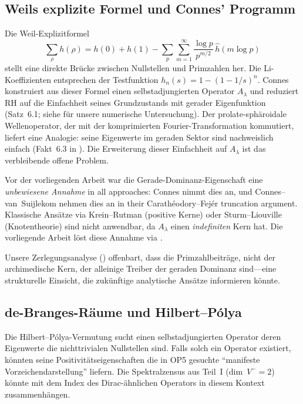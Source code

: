 \documentclass[12pt,a4paper]{article}
\theoremstyle{definition}
\theoremstyle{remark}
\begin{document}
\subsection{Weils explizite Formel und Connes' Programm}
Die Weil-Explizitformel
\[ \sum_\rho h(\rho) = h(0) + h(1) - \sum_p \sum_{m=1}^\infty \frac{\log p}{p^{m/2}}\,\hat{h}(m\log p) \]
stellt eine direkte Brücke zwischen Nullstellen und Primzahlen her. Die Li-Koeffizienten entsprechen der Testfunktion $h_n(s) = 1-(1-1/s)^n$. Connes \cite{Connes2026} konstruiert aus dieser Formel einen selbstadjungierten Operator $A_\lambda$ und reduziert RH auf die Einfachheit seines Grundzustands mit gerader Eigenfunktion (Satz~6.1; siehe  für unsere numerische Untersuchung). Der prolate-sphäroidale Wellenoperator, der mit der komprimierten Fourier-Transformation kommutiert, liefert eine Analogie: seine Eigenwerte im geraden Sektor sind nachweislich einfach (Fakt~6.3 in \cite{Connes2026}). Die Erweiterung dieser Einfachheit auf $A_\lambda$ ist das verbleibende offene Problem.

Vor der vorliegenden Arbeit war die Gerade-Dominanz-Eigenschaft eine \emph{unbewiesene Annahme} in all approaches: Connes \cite{Connes2026} nimmt dies an, und Connes--van~Suijlekom \cite{ConnesvS2025} nehmen dies an in their Carath\'eodory--Fej\'er truncation argument. Klassische Ansätze via Krein--Rutman (positive Kerne) oder Sturm--Liouville (Knotentheorie) sind nicht anwendbar, da $A_\lambda$ einen \emph{indefiniten} Kern hat. Die vorliegende Arbeit löst diese Annahme via .

Unsere Zerlegungsanalyse () offenbart, dass die Primzahlbeiträge, nicht der archimedische Kern, der alleinige Treiber der geraden Dominanz sind---eine strukturelle Einsicht, die zukünftige analytische Ansätze informieren könnte.

\subsection{de-Branges-R\"aume und Hilbert--P\'olya}
Die Hilbert--Pólya-Vermutung sucht einen selbstadjungierten Operator deren Eigenwerte die nichttrivialen Nullstellen sind. Falls solch ein Operator existiert, könnten seine Positivitätseigenschaften die in OP5 gesuchte ``manifeste Vorzeichendarstellung'' liefern. Die Spektralzensus aus Teil~I (dim~$V^- = 2$) könnte mit dem Index des Dirac-ähnlichen Operators in diesem Kontext zusammenhängen.


\end{document}
